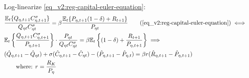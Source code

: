\documentclass[../thesis.tex]{subfiles}
\begin{document}
Log-linearize \ref{eq_v2:reg-capital-euler-equation}:
\begin{align}
	& \frac{\mathbb{E}_{t} \{ Q_{\eta,t+1} C_{\eta,t+1}^{\sigma} \} }{ Q_{\eta t} C_{\eta t}^{\sigma} } = \beta \frac{ \mathbb{E}_{t} \{ P_{\eta,t+1} (1 - \delta) + R_{t+1} \} }{P_{\eta t}} \tag{\ref{eq_v2:reg-capital-euler-equation}} \iff \\
	& \mathbb{E}_{t} \left\{ \frac{Q_{\eta,t+1} C_{\eta,t+1}^{\sigma}}{P_{\eta,t+1}} \right\} \cdot \frac{P_{\eta t}}{Q_{\eta t} C_{\eta t}^{\sigma}} = \beta \mathbb{E}_{t} \left\{ (1 - \delta) + \frac{R_{t+1}}{P_{\eta, t+1}} \right\} \implies \nonumber \\
	& (\hat{Q}_{\eta, t+1} - \hat{Q}_{\eta t}) + \sigma(\hat{C}_{\eta, t+1} - \hat{C}_{\eta t}) - (\hat{P}_{\eta, t+1} - \hat{P}_{\eta, t}) = \beta r_{}(\hat{R}_{\eta, t+1} - \hat{P}_{\eta, t+1}) \label{eq_v2:reg-ll-capital-euler-equation} \\
	& \qquad \text{where: } r_{} = \frac{R_{K}}{P_{\eta}} \label{eq_v2:reg-rk}
\end{align}

\begin{comment}

\begin{align}
	& \mathbb{E}_{t} \left\{ \frac{Q_{\eta,t+1} C_{\eta,t+1}^{\sigma}}{P_{\eta,t+1}} \right\}
	\cdot \frac{P_{\eta t}}{Q_{\eta t} C_{\eta t}^{\sigma}} = \beta \mathbb{E}_{t} \left\{ (1 - \delta) + $\frac{R_{t+1}}{P_{\eta, t+1}}$ \right\} \nonumber
	\\
	& \frac{P_{\eta t} C_{\eta t}^{1-\sigma}}{Q_{\eta t}} \mathbb{E}_t \left\{ \frac{\te[t+1]}{P_{\eta, t+1} C_{\eta, t+1}^{1-\sigma}} \right\} = \beta \left[ (1-\delta) + \mathbb{E}_t \left\{ \frac{R_{K,t+1}}{P_{\eta, t+1}} \right\} \right] \implies \nonumber \\
	& \frac{P_{\eta} C_{\eta}^{1-\sigma}}{\te[]} \cdot \frac{\te[]}{P_{\eta} C_{\eta}^{1-\sigma}} (1 + \hat{P}_{\eta t} + (1 -\sigma) \hat{C}_{\eta t} - \hat{\mathscr{E}}_{\eta t} + \nonumber \\ 
	& \qquad + \E \{\hat{\mathscr{E}}_{\eta, t+1} - \hat{P}_{\eta, t+1} - (1 -\sigma) \hat{C}_{\eta, t+1}\}) = \nonumber \\
	& \qquad = \beta \left[ (1-\delta) + \frac{R_{K}}{P_{\eta}} \mathbb{E}_t \left\{ 1 + \hat{R}_{K, t+1} -\hat{P}_{\eta, t+1} \right\} \right] \implies \nonumber \\
	& \E \left\{ \hat{\mathscr{E}}_{\eta, t+1} - \hat{P}_{\eta, t+1}  - (1 -\sigma) \hat{C}_{\eta, t+1} \right\} - (\hat{\mathscr{E}}_{\eta t} - \hat{P}_{\eta t} - (1 -\sigma) \hat{C}_{\eta t}) = \nonumber \\
	& \qquad = \beta r_{K} \mathbb{E}_t \left\{ \hat{R}_{K, t+1} - \hat{P}_{\eta, t+1} \right\} \label{eq_v2:reg-ll-capital-euler-equation} \\
	& \qquad \text{where: } r_{K} = \frac{R_{K}}{P_{}} \label{eq_v2:reg-rk}
\end{align}
	
\end{comment}
\end{document}

